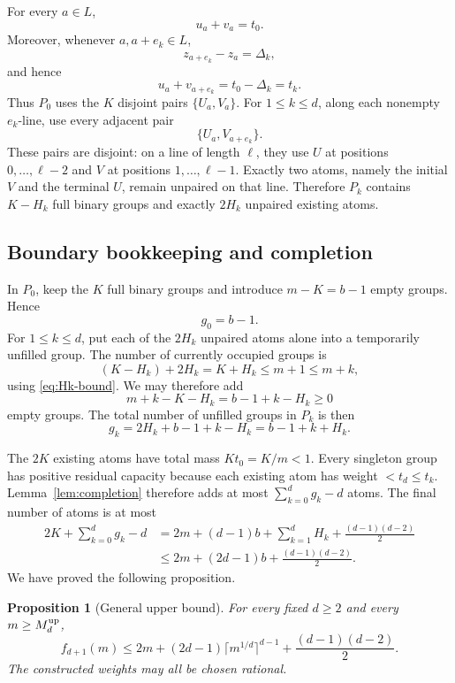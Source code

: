 \documentclass[11pt]{article}
\newtheorem{proposition}[theorem]{Proposition}
\theoremstyle{definition}
\newcommand{\1}{\mathbf{1}}
\begin{document}
For every $a\in L$,
\begin{equation}\label{eq:P0pair}
  u_a+v_a=t_0.
\end{equation}
Moreover, whenever $a,a+e_k\in L$,
\[
  z_{a+e_k}-z_a=\Delta_k,
\]
and hence
\begin{equation}\label{eq:Pkpair}
  u_a+v_{a+e_k}=t_0-\Delta_k=t_k.
\end{equation}
Thus $P_0$ uses the $K$ disjoint pairs $\{U_a,V_a\}$.
For $1\le k\le d$, along each nonempty $e_k$-line, use every adjacent pair
\[
  \{U_a,V_{a+e_k}\}.
\]
These pairs are disjoint: on a line of length $\ell$, they use $U$ at positions $0,\ldots,\ell-2$ and $V$ at positions $1,\ldots,\ell-1$.  Exactly two atoms, namely the initial $V$ and the terminal $U$, remain unpaired on that line.  Therefore $P_k$ contains $K-H_k$ full binary groups and exactly $2H_k$ unpaired existing atoms.

\subsection{Boundary bookkeeping and completion}

In $P_0$, keep the $K$ full binary groups and introduce $m-K=b-1$ empty groups.  Hence
\begin{equation}\label{eq:g0}
  g_0=b-1.
\end{equation}
For $1\le k\le d$, put each of the $2H_k$ unpaired atoms alone into a temporarily unfilled group.  The number of currently occupied groups is
\[
  (K-H_k)+2H_k=K+H_k\le m+1\le m+k,
\]
using \eqref{eq:Hk-bound}.  We may therefore add
\[
  m+k-K-H_k=b-1+k-H_k\ge0
\]
empty groups.  The total number of unfilled groups in $P_k$ is then
\begin{equation}\label{eq:gk}
  g_k=2H_k+b-1+k-H_k=b-1+k+H_k.
\end{equation}

The $2K$ existing atoms have total mass $Kt_0=K/m<1$.  Every singleton group has positive residual capacity because each existing atom has weight $<t_d\le t_k$.  Lemma~\ref{lem:completion} therefore adds at most $\sum_{k=0}^d g_k-d$ atoms.  The final number of atoms is at most
\begin{align*}
  2K+\sum_{k=0}^d g_k-d
  &=2m+(d-1)b+\sum_{k=1}^d H_k
      +\frac{(d-1)(d-2)}2\\
  &\le2m+(2d-1)b+\frac{(d-1)(d-2)}2.
\end{align*}
We have proved the following proposition.

\begin{proposition}[General upper bound]\label{prop:upper}
For every fixed $d\ge2$ and every $m\ge M_d^{\rm up}$,
\[
  f_{d+1}(m)
  \le2m+(2d-1)\lceil m^{1/d}\rceil^{d-1}
       +\frac{(d-1)(d-2)}2.
\]
The constructed weights may all be chosen rational.
\end{proposition}
\end{document}
